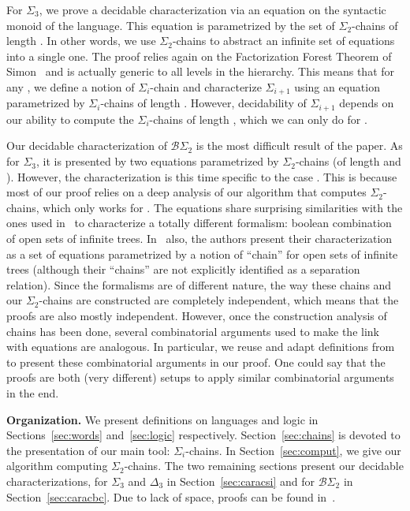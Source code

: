 \documentclass[envcountsame]{llncs}
\newcommand{\sic}[1]{\ensuremath{\Sigma_{#1}}\xspace}
\newcommand{\bscd}{\ensuremath{\mathcal{B}\Sigma_{2}}\xspace}
\newcommand{\dect}{\ensuremath{\Delta_{3}}\xspace}
\newcommand{\sict}{\ensuremath{\Sigma_{3}}\xspace}
\newcommand\chain{chain\xspace}
\newcommand\qchain[1]{\ensuremath{\sic{#1}}-chain\xspace}
\newcommand\chains{chains\xspace}
\newcommand\qchains[1]{\ensuremath{\sic{#1}}-chains\xspace}
\newcommand\ichain{\qchain{i}}
\newcommand\ichains{\qchains{i}}
\newcommand\dchains{\qchains{2}}
\begin{document}
For \sict, we prove a decidable characterization via an
equation on the syntactic monoid of the language. This equation is  
parametrized by the set of \dchains of length . In other words,
we use \dchains to abstract an infinite set of equations into a
single one. The proof relies again on the Factorization Forest Theorem
of Simon~\cite{simonfacto} and is actually generic to all levels in
the hierarchy. This means that for any , we define a notion of
\ichain and characterize \sic{i+1} using an equation parametrized by
\ichains of length . However, decidability of \sic{i+1}
depends on our ability to compute the \ichains of length , which we
can only do for .

Our decidable characterization of \bscd is the most difficult result of the
paper. As for \sict, it is presented by two equations parametrized by \dchains
(of length  and ). However, the characterization is this time specific
to the case . This is because most of our proof relies on a deep
analysis of our algorithm that computes \dchains, which only works for . The equations share surprising similarities with the ones used
in~\cite{bpopen} to characterize a totally different formalism: boolean
combination of open sets of infinite trees. In~\cite{bpopen} also, the authors
present their characterization as a set of equations parametrized by a notion
of ``\chain'' for open sets of infinite trees (although their ``\chains'' are
not explicitly identified as a separation relation). Since the formalisms are
of different nature, the way these \chains and our \dchains are constructed
are completely independent, which means that the proofs are also mostly
independent. However, once the construction analysis of \chains has been done,
several combinatorial arguments used to make the link with equations are
analogous. In particular, we reuse and adapt definitions from~\cite{bpopen} to
present these combinatorial arguments in our proof. One could say that the
proofs are both (very different) setups to apply similar combinatorial
arguments in the end.


\noindent
{\bf Organization.} We present definitions on languages
and logic in Sections~\ref{sec:words} and~\ref{sec:logic}
respectively. Section~\ref{sec:chains} is devoted to the presentation
of our main tool: \ichains. In Section~\ref{sec:comput}, we give our
algorithm computing \dchains. The two remaining sections present
our decidable characterizations, for \sict and \dect in
Section~\ref{sec:caracsi} and for \bscd in
Section~\ref{sec:caracbc}. Due to lack of space, proofs
can be found in~\cite{pz:qalt:2014}.
\end{document}
